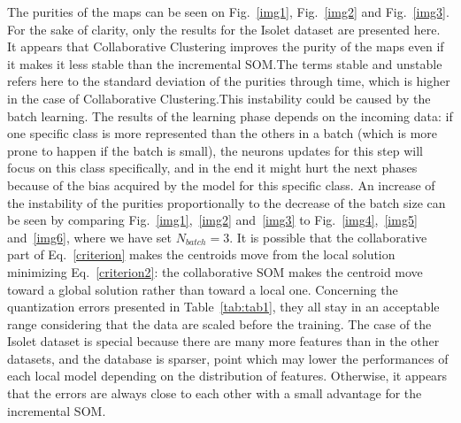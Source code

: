 	The purities of the maps can be seen on Fig.~\ref{img1}, Fig.~\ref{img2} and Fig.~\ref{img3}. For the sake of clarity, only the results for the Isolet dataset are presented here. It appears that Collaborative Clustering improves the purity of the maps even if it makes it less stable than the incremental SOM.\@ The terms stable and unstable refers here to the standard deviation of the purities through time, which is higher in the case of Collaborative Clustering.\@ This instability could be caused by the batch learning. The results of the learning phase depends on the incoming data: if one specific class is more represented than the others in a batch (which is more prone to happen if the batch is small), the neurons updates for this step will focus on this class specifically, and in the end it might hurt the next phases because of the bias acquired by the model for this specific class. An increase of the instability of the purities proportionally to the decrease of the batch size can be seen by comparing Fig.~\ref{img1},~\ref{img2} and~\ref{img3} to Fig.~\ref{img4},~\ref{img5} and~\ref{img6}, where we have set $N_{batch}=3$. It is possible that the collaborative part of Eq.~\ref{criterion} makes the centroids move from the local solution minimizing Eq.~\ref{criterion2}: the collaborative SOM makes the centroid move toward a global solution rather than toward a local one. Concerning the quantization errors presented in Table~\ref{tab:tab1}, they all stay in an acceptable range considering that the data are scaled before the training. The case of the Isolet dataset is special because there are many more features than in the other datasets, and the database is sparser, point which may lower the performances of each local model depending on the distribution of features. Otherwise, it appears that the errors are always close to each other with a small advantage for the incremental SOM.\@ 
	
